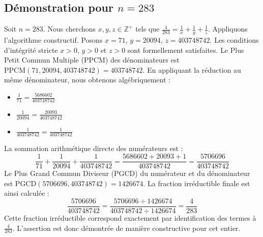 \documentclass[11pt,a4paper]{article}
\begin{document}
\subsection{Démonstration pour $n = 283$}
Soit $n = 283$. Nous cherchons $x, y, z \in \mathbb{Z}^{+}$ tels que $\frac{4}{283} = \frac{1}{x} + \frac{1}{y} + \frac{1}{z}$.
Appliquons l'algorithme constructif. Posons $x = 71$, $y = 20094$, $z = 403748742$.
Les conditions d'intégrité stricte $x > 0$, $y > 0$ et $z > 0$ sont formellement satisfaites.
Le Plus Petit Commun Multiple (PPCM) des dénominateurs est $\text{PPCM}(71, 20094, 403748742) = 403748742$.
En appliquant la réduction au même dénominateur, nous obtenons algébriquement :
\begin{itemize}
    \item $\frac{1}{71} = \frac{5686602}{403748742}$
    \item $\frac{1}{20094} = \frac{20093}{403748742}$
    \item $\frac{1}{403748742} = \frac{1}{403748742}$
\end{itemize}
La sommation arithmétique directe des numérateurs est :
$$ \frac{1}{71} + \frac{1}{20094} + \frac{1}{403748742} = \frac{5686602 + 20093 + 1}{403748742} = \frac{5706696}{403748742} $$
Le Plus Grand Commun Diviseur (PGCD) du numérateur et du dénominateur est $\text{PGCD}(5706696, 403748742) = 1426674$.
La fraction irréductible finale est ainsi calculée :
$$ \frac{5706696}{403748742} = \frac{5706696 \div 1426674}{403748742 \div 1426674} = \frac{4}{283} $$
Cette fraction irréductible correspond exactement par identification des termes à $\frac{4}{283}$. L'assertion est donc démontrée de manière constructive pour cet entier.
\end{document}
